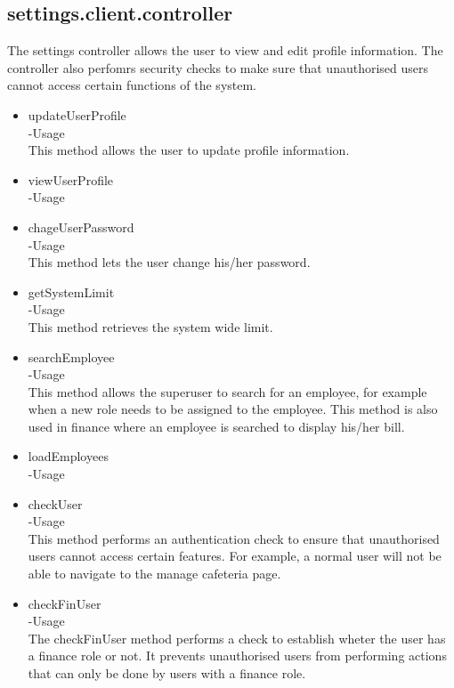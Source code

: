 \documentclass[a4paper,12pt]{article}
\begin{document}
 \subsection{settings.client.controller}
 The settings controller allows the user to view and edit profile information. The controller also perfomrs security checks to make sure that unauthorised users cannot access certain functions of the system. 
 \begin{itemize}
 \item updateUserProfile\\
 -Usage\\
 This method allows the user to update profile information.
\item viewUserProfile\\
-Usage\\

\item chageUserPassword\\
-Usage\\
This method lets the user change his/her password.

\item getSystemLimit\\
-Usage\\
This method retrieves the system wide limit.

\item searchEmployee\\
-Usage\\
This method allows the superuser to search for an employee, for example when a new role needs to be assigned to the employee.
This method is also used in finance where an employee is searched to display his/her bill.

\item loadEmployees\\
-Usage\\

\item checkUser\\
-Usage\\
This method performs an authentication check to ensure that unauthorised users cannot access certain features. For example, a normal user will not be able to navigate to the manage cafeteria page.

\item checkFinUser\\
-Usage\\
The checkFinUser method performs a check to establish wheter the user has a finance role or not. It prevents unauthorised users from performing actions that can only be done by users with a finance role.
 \end{itemize}
\end{document}
